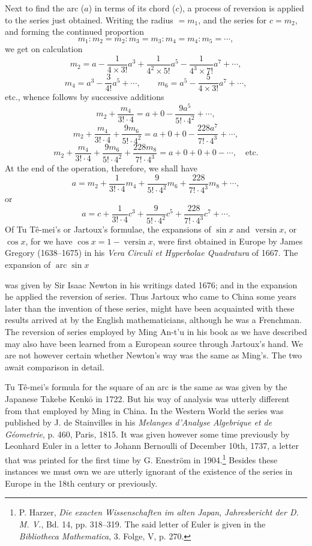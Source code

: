 \documentclass[11pt]{article}
\newcommand{\scanpage}[2]{\clearpage\setcounter{footnote}{0}\noindent{\footnotesize\color{gray}PDF page #1 · #2}\par\medskip}
\newcommand{\scanfooter}{}
\newcommand{\arcop}{\mathop{\mathrm{arc}}}
\newcommand{\versin}{\mathop{\mathrm{versin}}}
\begin{document}
Next to find the arc ($a$) in terms of its chord ($c$), a process of reversion is applied to the series just obtained. Writing the radius $=m_1$, and the series for $c=m_2$, and forming the continued proportion
\[
m_1:m_2=m_2:m_3=m_3:m_4=m_4:m_5=\cdots,
\]
we get on calculation
\[
m_2=a-\frac1{4\times3!}a^3+\frac1{4^2\times5!}a^5-\frac1{4^3\times7!}a^7+\cdots,
\]
\[
m_4=a^3-\frac3{4!}a^5+\cdots,
\qquad
m_6=a^5-\frac5{4\times3!}a^7+\cdots,
\]
etc., whence follows by successive additions
\[
m_2+\frac{m_4}{3!\cdot4}=a+0-\frac{9a^5}{5!\cdot4^2}+\cdots,
\]
\[
m_2+\frac{m_4}{3!\cdot4}+\frac{9m_6}{5!\cdot4^2}=a+0+0-\frac{228a^7}{7!\cdot4^3}+\cdots,
\]
\[
m_2+\frac{m_4}{3!\cdot4}+\frac{9m_6}{5!\cdot4^2}+\frac{228m_8}{7!\cdot4^3}=a+0+0+0-\cdots,\quad\mathrm{etc.}
\]
At the end of the operation, therefore, we shall have
\[
a=m_2+\frac1{3!\cdot4}m_4+\frac9{5!\cdot4^2}m_6+\frac{228}{7!\cdot4^3}m_8+\cdots,
\]
or
\[
a=c+\frac1{3!\cdot4}c^3+\frac9{5!\cdot4^2}c^5+\frac{228}{7!\cdot4^3}c^7+\cdots.
\]
Of Tu Tê-mei's or Jartoux's formulae, the expansions of $\sin x$ and $\versin x$, or $\cos x$, for we have $\cos x=1-\versin x$, were first obtained in Europe by James Gregory (1638--1675) in his \emph{Vera Circuli et Hyperbolae Quadratura} of 1667. The expansion of $\arcop\sin x$
\scanfooter

\scanpage{0163}{Chapter 21, printed page 149}
was given by Sir Isaac Newton in his writings dated 1676; and in the expansion he applied the reversion of series. Thus Jartoux who came to China some years later than the invention of these series, might have been acquainted with these results arrived at by the English mathematicians, although he was a Frenchman. The reversion of series employed by Ming An-t'u in his book as we have described may also have been learned from a European source through Jartoux's hand. We are not however certain whether Newton's way was the same as Ming's. The two await comparison in detail.

Tu Tê-mei's formula for the square of an arc is the same as was given by the Japanese Takebe Kenkō in 1722. But his way of analysis was utterly different from that employed by Ming in China. In the Western World the series was published by J. de Stainvilles in his \emph{Melanges d'Analyse Algebrique et de Géometrie}, p. 460, Paris, 1815. It was given however some time previously by Leonhard Euler in a letter to Johann Bernoulli of December 10th, 1737, a letter that was printed for the first time by G. Eneström in 1904.\footnote{P. Harzer, \emph{Die exacten Wissenschaften im alten Japan}, \emph{Jahresbericht der D. M. V.}, Bd. 14, pp. 318--319. The said letter of Euler is given in the \emph{Bibliotheca Mathematica}, 3. Folge, V, p. 270.} Besides these instances we must own we are utterly ignorant of the existence of the series in Europe in the 18th century or previously.
\end{document}
